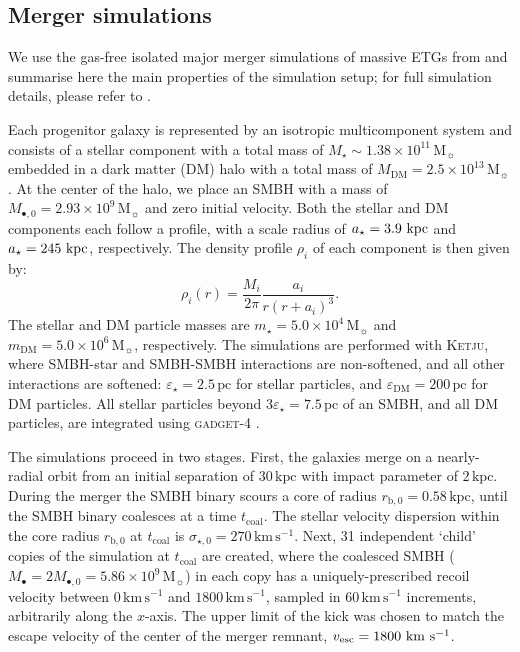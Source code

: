 \documentclass[twocolumn]{aastex631}
\newcommand{\ketju}{\textsc{Ketju}}                           %
\newcommand{\gadget}{\textsc{gadget-4}}                       %
\newcommand{\Msun}{\ensuremath{\mathrm{M}_{\sun}}}            %
\newcommand{\kmps}{\ensuremath{\mathrm{km}\,\mathrm{s}^{-1}} }%
\newcommand{\sigcore}{\ensuremath{\sigma_{\star,0}}}          %
\begin{document}
\subsection{Merger simulations}\label{ssec:merger_sims}
We use the gas-free isolated major merger simulations of massive ETGs from \citet{rawlings2025} and summarise here the main properties of the simulation setup; for full simulation details, please refer to \citet{rawlings2025}.

Each progenitor galaxy is represented by an isotropic multicomponent system and consists of a stellar component with a total mass of $M_\star\sim 1.38\times10^{11}\,\Msun$ embedded in a dark matter (DM) halo with a total mass of $M_\mathrm{DM} = 2.5\times10^{13}\,\Msun$ \citep{moster2010}. At the center of the halo, we place an SMBH with a mass of $M_{\bullet,0} = 2.93 \times 10^9\,\Msun$ \citep{sahu2019} and zero initial velocity. Both the stellar and DM components each follow a \citet{hernquist1990} profile, with a scale radius of $a_{\star}=3.9 \ \rm kpc$ and  $a_{\star}=245 \ \rm kpc$, respectively. The density profile $\rho_{i}$ of each component is then given by:
\begin{equation}\label{eq:hernquist}
   \rho_{i}(r)=\frac{M_{i}}{2\pi}\frac{a_{i}}{r(r+a_{i})^{3}}.
\end{equation}
The stellar and DM particle masses are $m_\star=5.0\times10^4\,\Msun$ and $m_\mathrm{DM} = 5.0\times10^6\,\Msun$, respectively.
The simulations are performed with \ketju{}, where SMBH-star and SMBH-SMBH interactions are non-softened, and all other interactions are softened: $\varepsilon_\star=2.5\,\mathrm{pc}$ for stellar particles, and $\varepsilon_\mathrm{DM}=200\,\mathrm{pc}$ for DM particles.
All stellar particles beyond $3\varepsilon_\star=7.5\,\mathrm{pc}$ of an SMBH, and all DM particles, are integrated using \gadget{} \citep{springel2021}.

The simulations proceed in two stages.
First, the galaxies merge on a nearly-radial orbit from an initial separation of $30\,\mathrm{kpc}$ with impact parameter of $2\,\mathrm{kpc}$.
During the merger the SMBH binary scours a core of radius $r_{\mathrm{b},0}=0.58\,\mathrm{kpc}$, until the SMBH binary coalesces at a time $t_\mathrm{coal}$.
The stellar velocity dispersion within the core radius $r_{\mathrm{b},0}$ at $t_\mathrm{coal}$ is $\sigcore=270\,\kmps$.
Next, 31 independent `child' copies of the simulation at $t_\mathrm{coal}$ are created, where the coalesced SMBH ($M_\bullet=2M_{\bullet,0}=5.86\times10^9\,\Msun$) in each copy has a uniquely-prescribed recoil velocity between $0\,\kmps$ and $1800\,\kmps$, sampled in $60\,\kmps$ increments, arbitrarily along the $x$-axis.
The upper limit of the kick was chosen to match the escape velocity of the center of the merger remnant, $v_{\rm esc}=1800 \ \rm km \ s^{-1}$.
\end{document}

